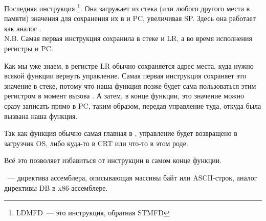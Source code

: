 Последняя инструкция \footnote{\ac{LDMFD}~--- это инструкция, обратная \ac{STMFD}}.
Она загружает из стека (или любого другого места в памяти) значения для сохранения их в  и \ac{PC}, увеличивая  \ac{SP}.
Здесь она работает как аналог \POP.\\
N.B. Самая первая инструкция  сохранила в стеке  и \ac{LR}, а  во время исполнения  регистры  и \ac{PC}.

Как мы уже знаем, в регистре \ac{LR} обычно сохраняется адрес места, куда нужно всякой функции вернуть управление.
Самая первая инструкция сохраняет это значение в стеке, потому что наша функция \main позже будет сама пользоваться этим регистром в момент вызова \printf.
А затем, в конце функции, это значение можно сразу записать прямо в \ac{PC}, таким образом, передав управление туда, откуда была вызвана наша функция.

Так как функция \main обычно самая главная в \CCpp, управление будет возвращено в загрузчик \ac{OS}, либо куда-то в \ac{CRT} 
или что-то в этом роде.

Всё это позволяет избавиться от инструкции  в самом конце функции.

~--- директива ассемблера, описывающая массивы байт или ASCII-строк, аналог директивы DB в x86-ассемблере.

